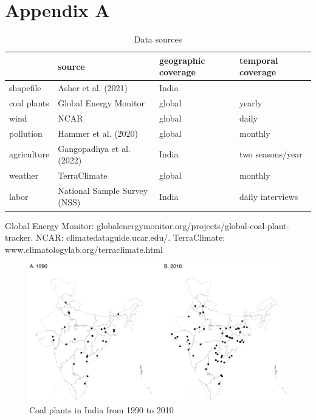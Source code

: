 \documentclass[
]{article}
\newcommand{\beginappendix}{ \setcounter{table}{0} \renewcommand{\thetable}{A\arabic{table}} \setcounter{figure}{0} \renewcommand{\thefigure}{A\arabic{figure}} }
\begin{document}
\FloatBarrier
\newpage

\hypertarget{appendix-a}{%
\section*{Appendix A}\label{appendix-a}}

\beginappendix
\FloatBarrier

\begin{table}[H]

\caption{\label{tab:data}Data sources}
\centering
\begin{threeparttable}
\begin{tabular}[t]{>{\raggedright\arraybackslash}p{2cm}>{\centering\arraybackslash}p{5cm}>{\centering\arraybackslash}p{3cm}>{\centering\arraybackslash}p{3cm}}
\toprule
  & source & geographic coverage & temporal coverage\\
\midrule
shapefile & Asher et al. (2021) & India & \\
coal plants & Global Energy Monitor & global & yearly\\
wind & NCAR & global & daily\\
pollution & Hammer et al. (2020) & global & monthly\\
agriculture & Gangopadhya et al. (2022) & India & two seasons/year\\
weather & TerraClimate & global & monthly\\
labor & National Sample Survey (NSS) & India & daily interviews\\
\bottomrule
\end{tabular}
\begin{tablenotes}[para]
\item Global Energy Monitor: globalenergymonitor.org/projects/global-coal-plant-tracker. NCAR: climatedataguide.ucar.edu/. TerraClimate: www.climatologylab.org/terraclimate.html
\end{tablenotes}
\end{threeparttable}
\end{table}

\FloatBarrier
\newpage

\begin{figure}
\includegraphics{draft_files/figure-latex/plants-1} \caption[Coal plants in India from 1990 to 2010]{Coal plants in India from 1990 to 2010}\label{fig:plants}
\end{figure}
\end{document}
